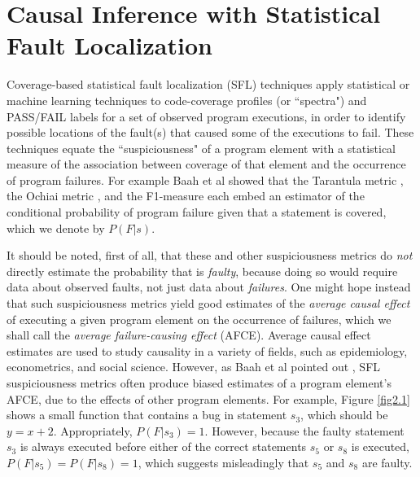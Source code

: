 \section{Causal Inference with Statistical Fault Localization}
Coverage-based statistical fault localization (SFL) techniques apply statistical or machine learning techniques to code-coverage profiles (or ``spectra") and PASS/FAIL labels for a set of observed program executions, in order to identify possible locations of the fault(s) that caused some of the executions to fail.  These techniques equate the ``suspiciousness" of a program element with a statistical measure of the association between coverage of that element and the occurrence of program failures.  For example Baah et al showed \cite{baah2010causal} that the Tarantula metric \cite{jones2002visualization}, the Ochiai metric \cite{abreu2007accuracy}, and the F1-measure \cite{baah2010causal} each embed an estimator of the conditional probability of program failure given that a statement  is covered, which we denote by $P(F|s)$.  

It should be noted, first of all, that these and other suspiciousness metrics do {\it not} directly estimate the probability that is {\it faulty}, because doing so would require data about observed faults, not just data about {\it failures}.  One might hope instead that such suspiciousness metrics yield good estimates of the {\it average causal effect} \cite{pearl2000models} of executing a given program element on the occurrence of failures, which we shall call the {\it average failure-causing effect} (AFCE).  Average causal effect estimates are used to study causality in a variety of fields, such as epidemiology, econometrics, and social science.  However, as Baah et al pointed out \cite{baah2010causal}, SFL suspiciousness metrics often produce biased estimates of a program element’s AFCE, due to the effects of other program elements.  For example, Figure \ref{fig2.1} shows a small function that contains a bug in statement $s_3$, which should be $y=x+2$.  Appropriately, $P(F|s_3)=1$.  However, because the faulty statement $s_3$ is always executed before either of the correct statements $s_5$ or $s_8$ is executed, $P(F|s_5)=P(F|s_8)=1$, which suggests misleadingly that $s_5$ and $s_8$ are faulty.

